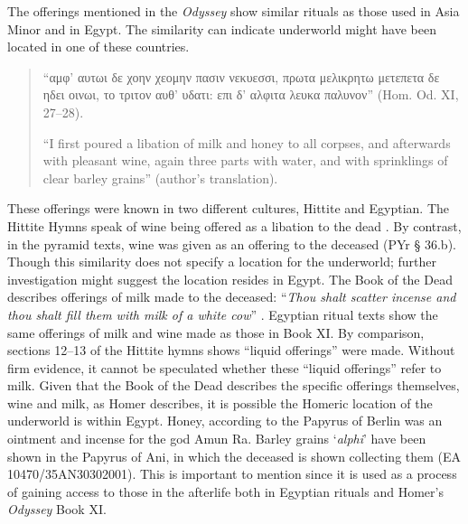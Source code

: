 	
	
	
	The offerings mentioned in the \emph{Odyssey} show similar rituals as those used in Asia Minor and in Egypt. The similarity can indicate underworld might have been located in one of these countries.
	
	\begin{quote}
		
	“αμφ’ αυτωι δε χοην χεομην πασιν νεκυεσσι,
	πρωτα μελικρητω μετεπετα δε ηδει οινωι,
	το τριτον αυθ’ υδατι: επι δ’ αλφιτα λευκα παλυνον”  (Hom. Od. XI, 27–28).
	
	“I first poured a libation of milk and honey to all corpses, and afterwards with pleasant wine, again three parts with water, and with sprinklings of clear barley grains” (author’s translation).
	
	\end{quote}
	These offerings were known in two different cultures, Hittite and Egyptian. The Hittite Hymns speak of wine being offered as a libation to the dead \parencite{Kapelus2011}. By contrast, in the pyramid texts, wine was given as an offering to the deceased (PYr § 36.b). Though this similarity does not specify a location for the underworld; further investigation might suggest the location resides in Egypt. The Book of the Dead describes offerings of milk made to the deceased: “\emph{Thou shalt scatter incense and thou shalt fill them with milk of a white cow}” \parencite[414]{Budge1969}. Egyptian ritual texts show the same offerings of milk and wine made as those in Book XI. By comparison, sections 12–13 of the Hittite hymns shows “liquid offerings” \parencite[12–-13]{Kapelus2011} were made. Without firm evidence, it cannot be speculated whether these “liquid offerings” refer to milk. Given that the Book of the Dead describes the specific offerings themselves, wine and milk, as Homer describes, it is possible the Homeric location of the underworld is within Egypt. Honey, according to the Papyrus of Berlin \parencite{UCL2002} was an ointment and incense for the god Amun Ra. Barley grains ‘\emph{alphi}’ have been shown in the Papyrus of Ani, in which the deceased is shown collecting them (EA 10470/35AN30302001). This is important to mention since it is used as a process of gaining access to those in the afterlife both in Egyptian rituals and Homer’s \emph{Odyssey} Book XI.
		
